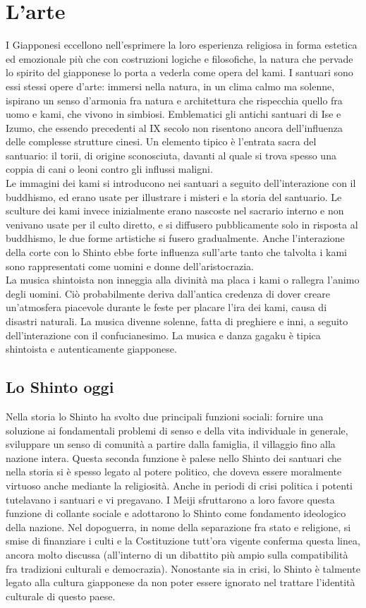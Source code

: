 \documentclass[10pt,a4paper]{report}
\begin{document}
\section{L'arte}
I Giapponesi eccellono nell'esprimere la loro esperienza religiosa in forma estetica ed emozionale più che con costruzioni logiche e filosofiche, la natura che pervade lo spirito del giapponese lo porta a vederla come opera del kami. I santuari sono essi stessi opere d'arte: immersi nella natura, in un clima calmo ma solenne, ispirano un senso d'armonia fra natura e architettura che rispecchia quello fra uomo e kami, che vivono in simbiosi. Emblematici gli antichi santuari di Ise e Izumo, che essendo precedenti al IX secolo non risentono ancora dell'influenza delle complesse strutture cinesi. Un elemento tipico è l'entrata sacra del santuario: il torii, di origine sconosciuta, davanti al quale si trova spesso una coppia di cani o leoni contro gli influssi maligni.\\
Le immagini dei kami si introducono nei santuari a seguito dell'interazione con il buddhismo, ed erano usate per illustrare i misteri e la storia del santuario. Le sculture dei kami invece inizialmente erano nascoste nel sacrario interno e non venivano usate per il culto diretto, e si diffusero pubblicamente solo in risposta al buddhismo, le due forme artistiche si fusero gradualmente. Anche l'interazione della corte con lo Shinto ebbe forte influenza sull'arte tanto che talvolta i kami sono rappresentati come uomini e donne dell'aristocrazia.\\
La musica shintoista non inneggia alla divinità ma placa i kami o rallegra l'animo degli uomini. Ciò probabilmente deriva dall'antica credenza di dover creare un'atmosfera piacevole durante le feste per placare l'ira dei kami, causa di disastri naturali. La musica divenne solenne, fatta di preghiere e inni, a seguito dell'interazione con il confucianesimo. La musica e danza gagaku è tipica shintoista e autenticamente giapponese.  
\subsection{Lo Shinto oggi}
Nella storia lo Shinto ha svolto due principali funzioni sociali: fornire una soluzione ai fondamentali problemi di senso e della vita individuale in generale, sviluppare un senso di comunità a partire dalla famiglia, il villaggio fino alla nazione intera. Questa seconda funzione è palese nello Shinto dei santuari che nella storia si è spesso legato al potere politico, che doveva essere moralmente virtuoso anche mediante la religiosità. Anche in periodi di crisi politica i potenti tutelavano i santuari e vi pregavano. I Meiji sfruttarono a loro favore questa funzione di collante sociale e adottarono lo Shinto come fondamento ideologico della nazione. Nel dopoguerra, in nome della separazione fra stato e religione, si smise di finanziare i culti e la Costituzione tutt'ora vigente conferma questa linea, ancora molto discussa (all'interno di un dibattito più ampio sulla compatibilità fra tradizioni culturali e democrazia). Nonostante sia in crisi, lo Shinto è talmente legato alla cultura giapponese da non poter essere ignorato nel trattare l'identità culturale di questo paese. 
\end{document}
